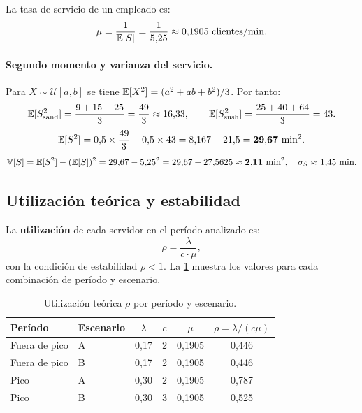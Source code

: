 La tasa de servicio de un empleado es:
\[
  \mu = \frac{1}{\operatorname{\mathbb{E}}[S]} = \frac{1}{5{,}25} \approx 0{,}1905 \text{ clientes/min.}
\]

\paragraph{Segundo momento y varianza del servicio.}
Para $X \sim \mathcal{U}[a,b]$ se tiene
$\operatorname{\mathbb{E}}[X^2] = (a^2 + ab + b^2)/3$.
Por tanto:
\[
  \operatorname{\mathbb{E}}[S_{\text{sand}}^2] = \frac{9 + 15 + 25}{3} = \frac{49}{3} \approx 16{,}33, \qquad
  \operatorname{\mathbb{E}}[S_{\text{sush}}^2] = \frac{25 + 40 + 64}{3} = 43.
\]
\[
  \operatorname{\mathbb{E}}[S^2] = 0{,}5 \times \frac{49}{3} + 0{,}5 \times 43
           = 8{,}167 + 21{,}5 = \mathbf{29{,}67} \text{ min}^2.
\]
\[
  \operatorname{\mathbb{V}}[S] = \operatorname{\mathbb{E}}[S^2] - (\operatorname{\mathbb{E}}[S])^2 = 29{,}67 - 5{,}25^2 = 29{,}67 - 27{,}5625
         \approx \mathbf{2{,}11} \text{ min}^2, \quad
  \sigma_S \approx 1{,}45 \text{ min.}
\]

\subsection{Utilización teórica y estabilidad}

La \textbf{utilización} de cada servidor en el período analizado es:
\begin{equation}
  \rho = \frac{\lambda}{c \cdot \mu},
  \label{eq:rho}
\end{equation}
con la condición de estabilidad $\rho < 1$.
La \cref{tab:utilizacion_teorica} muestra los valores para cada combinación
de período y escenario.

\begin{table}[H]
  \centering
  \caption{Utilización teórica $\rho$ por período y escenario.}
  \label{tab:utilizacion_teorica}
  \begin{tabular}{llcccc}
    \toprule
    \textbf{Período} & \textbf{Escenario} & $\lambda$ & $c$ & $\mu$ & $\rho = \lambda/(c\mu)$ \\
    \midrule
    Fuera de pico & A & 0{,}17 & 2 & 0{,}1905 & 0{,}446 \\
    Fuera de pico & B & 0{,}17 & 2 & 0{,}1905 & 0{,}446 \\
    Pico          & A & 0{,}30 & 2 & 0{,}1905 & 0{,}787 \\
    Pico          & B & 0{,}30 & 3 & 0{,}1905 & 0{,}525 \\
    \bottomrule
  \end{tabular}
\end{table}

